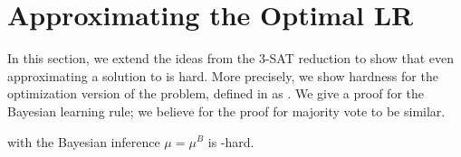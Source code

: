\section{Approximating the Optimal LR}
\label{sec:approx}

In this section, we extend the ideas from the 3-SAT reduction 
to show that even approximating a solution to \netlearn{} is hard.
More precisely, we show hardness for the optimization version of the problem, defined in  as \netlearnopt{}.
We give a proof for the Bayesian learning rule; we believe for the proof for majority vote to be similar.

\begin{theorem}[ ]\label{thm:approx}
    \netlearnopt{} with the Bayesian inference $\mu = \mu^B$ is \apx-hard. 
\end{theorem}

